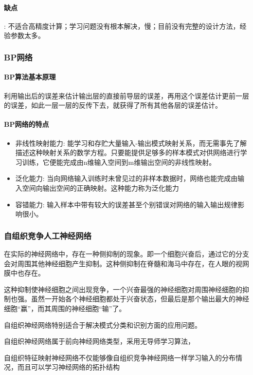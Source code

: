 \documentclass[UTF8,a4paper]{ctexart}
\begin{document}
\paragraph{缺点} : 不适合高精度计算；学习问题没有根本解决，慢；目前没有完整的设计方法，经验参数太多。

\subsubsection{BP网络}
\paragraph{BP算法基本原理}
利用输出后的误差来估计输出层的直接前导层的误差，再用这个误差估计更前一层的误差，如此一层一层的反传下去，就获得了所有其他各层的误差估计。

\paragraph{BP网络的特点}
\begin{itemize}
	\item 非线性映射能力:
	      能学习和存贮大量输入-输出模式映射关系，而无需事先了解描述这种映射关系的数学方程。只要能提供足够多的样本模式对供网络进行学习训练，它便能完成由n维输入空间到m维输出空间的非线性映射。
	\item 泛化能力:
	      当向网络输入训练时未曾见过的非样本数据时，网络也能完成由输入空间向输出空间的正确映射。这种能力称为泛化能力
	\item 容错能力:
	      输入样本中带有较大的误差甚至个别错误对网络的输入输出规律影响很小。
\end{itemize}

\subsubsection{自组织竞争人工神经网络}
在实际的神经网络中，存在一种侧抑制的现象。即一个细胞兴奋后，通过它的分支会对周围其他神经细胞产生抑制。这种侧抑制在脊髓和海马中存在，在人眼的视网膜中也存在。

这种抑制使神经细胞之间出现竞争，一个兴奋最强的神经细胞对周围神经细胞的抑制也强。虽然一开始各个神经细胞都处于兴奋状态，但最后是那个输出最大的神经细胞“赢”，而其周围的神经细胞“输”了。

自组织神经网络特别适合于解决模式分类和识别方面的应用问题。

自组织神经网络属于前向神经网络类型，采用无导师学习算法，

自组织特征映射神经网络不仅能够像自组织竞争神经网络一样学习输入的分布情况，而且可以学习神经网络的拓扑结构
\end{document}
